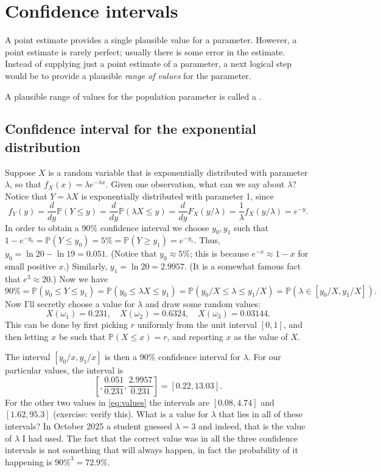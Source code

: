 

\section{Confidence intervals}
\label{confidenceIntervals}


A point estimate provides a single plausible value for a parameter. However, a point estimate is rarely perfect; usually there is some error in the estimate. Instead of supplying just a point estimate of a parameter, a next logical step would be to provide a plausible \emph{range of values} for the parameter.


A plausible range of values for the population parameter is called a .

\subsection{Confidence interval for the exponential distribution}
Suppose $X$ is a random variable that is exponentially distributed with parameter $\lambda$, so that $f_X(x)=\lambda e^{-\lambda x}$.
Given one observation, what can we say about $\lambda$?
Notice that $Y=\lambda X$ is exponentially distributed with parameter 1, since
\[
f_Y(y) = \frac{d}{dy}\mathbb P(Y \le y) = \frac{d}{dy}\mathbb P(\lambda X \le y) = \frac{d}{dy}F_X(y/\lambda) = \frac1{\lambda} f_X(y/\lambda)
= e^{-y}.
\]
In order to obtain a 90\% confidence interval we choose $y_0, y_1$ such that $1-e^{-y_0}=\mathbb P(Y\le y_0)=5\%=\mathbb P(Y\ge y_1)=e^{-y_1}$.
Thus, $y_0=\ln 20 - \ln 19 = 0.051$. (Notice that $y_0\approx 5\%$; this is because $e^{-x}\approx 1-x$ for small positive $x$.)
Similarly, $y_1 = \ln 20 = 2.9957$. (It is a somewhat famous fact that $e^3\approx 20$.)
Now we have
\[
90\% = \mathbb P(y_0 \le Y \le y_1) = \mathbb P(y_0 \le \lambda X \le y_1) = \mathbb P(y_0/X \le \lambda \le y_1/X) = \mathbb P(\lambda\in [y_0/X,y_1/X]).
\]
Now I'll secretly choose a value for $\lambda$ and draw some random values:
\begin{equation}\label{eq:values}
X(\omega_1) = 0.231,\quad X(\omega_2) = 0.6324,\quad X(\omega_3) = 0.03144.
\end{equation}
This can be done by first picking $r$ uniformly from the unit interval $[0,1]$, and then letting $x$ be such that $\mathbb P(X \le x) = r$, and reporting $x$ as the value of $X$.

The interval $[y_0/x,y_1/x]$ is then a 90\% confidence interval for $\lambda$.
For our particular values, the interval is
\[
\left[,\frac{0.051}{0.231}, \frac{2.9957}{0.231} \right] = \left[ 0.22, 13.03\right].
\]
For the other two values in \eqref{eq:values} the intervals are $[0.08, 4.74]$ and $[1.62, 95.3]$ (exercise: verify this).
What is a value for $\lambda$ that lies in all of these intervals? In October 2025 a student guessed $\lambda=3$ and indeed, that is
the value of $\lambda$ I had used. The fact that the correct value was in all the three confidence intervals is not something that will always happen,
in fact the probability of it happening is $90\%^3 = 72.9\%$.

